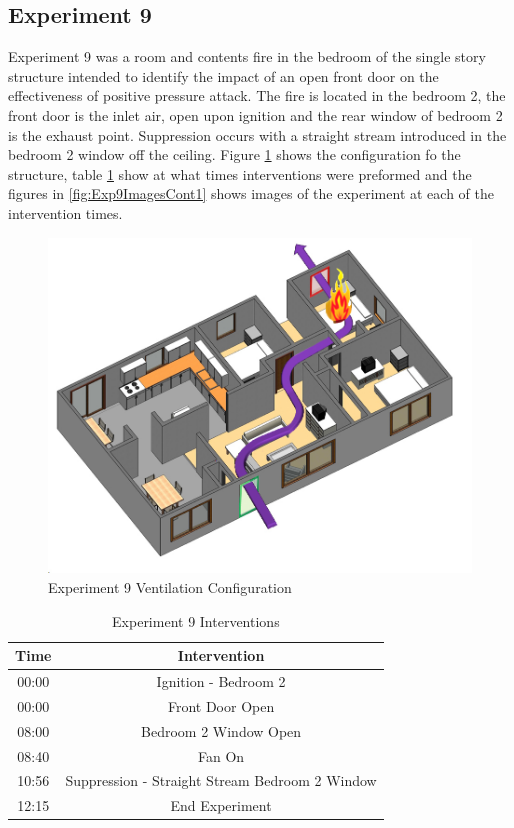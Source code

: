 \documentclass{article}
\begin{document}
\subsection{Experiment 9}
Experiment 9 was a room and contents fire in the bedroom of the single story structure intended to identify the impact of an open front door on the effectiveness of positive pressure attack. The fire is located in the bedroom 2, the front door is the inlet air, open upon ignition and the rear window of bedroom 2 is the exhaust point. Suppression occurs with a straight stream introduced in the bedroom 2 window off the ceiling. Figure \ref{fig:Exp9VentConfig} shows the configuration fo the structure, table \ref{Table:Exp9Interventions} show at what times interventions were preformed and the figures in \ref{fig:Exp9ImagesCont1} shows images of the experiment at each of the intervention times.

\begin{figure}[h!]
	\centering
	\includegraphics[width=5in]{0_Images/FireExperiments/Single_Story/Experiment_9.jpg}
	\caption{Experiment 9 Ventilation Configuration}
	\label{fig:Exp9VentConfig}
\end{figure}

\begin{table}[H]
	\centering
	\caption{Experiment 9 Interventions}
	\begin{tabular}{|c|c|} 
		\hline
		Time & Intervention \\ \hline \hline
		00:00 & Ignition - Bedroom 2 \\ \hline
		00:00 & Front Door Open \\ \hline
		08:00 & Bedroom 2 Window Open\\ \hline
		08:40 & Fan On\\ \hline
		10:56 & Suppression - Straight Stream Bedroom 2 Window\\ \hline
		12:15 & End Experiment\\ \hline
	\end{tabular}
	\label{Table:Exp9Interventions}
\end{table}
\end{document}
